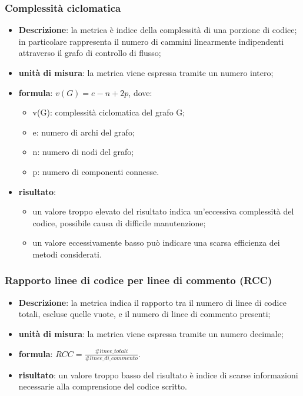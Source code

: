 	\subsubsection*{Complessità ciclomatica}
	\begin{itemize}
		\item{\textbf{Descrizione}}: la metrica è indice della complessità di una porzione di codice;  in particolare rappresenta il numero di cammini linearmente indipendenti attraverso il grafo di controllo di flusso; 
		\item{\textbf{unità di misura}}: la metrica viene espressa tramite un numero intero; 
		\item{\textbf{formula}}: $ v(G) = e - n + 2p $, dove: 
			\begin{itemize}
				\item{v(G)}: complessità ciclomatica del grafo G; 
				\item{e}: numero di archi del grafo; 
				\item{n}: numero di nodi del grafo; 
				\item{p}: numero di componenti connesse. 
			\end{itemize} 
		\item{\textbf{risultato}}:
			\begin{itemize}
				\item un valore troppo elevato del risultato indica un'eccessiva complessità del codice, possibile causa di difficile manutenzione; 
				\item un valore eccessivamente basso può indicare una scarsa efficienza dei metodi considerati. 
			\end{itemize} 
	\end{itemize}

	\subsubsection*{Rapporto linee di codice per linee di commento (RCC)}
	\begin{itemize}
		\item{\textbf{Descrizione}}: la metrica indica il rapporto tra il numero di linee di codice totali, escluse quelle vuote, e il numero di linee di commento presenti; 
		\item{\textbf{unità di misura}}: la metrica viene espressa tramite un numero decimale;  
		\item{\textbf{formula}}: $ RCC = \displaystyle\frac{\#linee\_totali}{\#linee\_di\_commento} $. 
		\item{\textbf{risultato}}: un valore troppo basso del risultato è indice di scarse informazioni necessarie alla comprensione del codice scritto. 
	\end{itemize}


